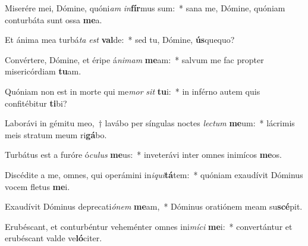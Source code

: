\item Miserére mei, Dómine, quóni\textit{am} \textit{in}\textbf{fír}mus sum:~* sana me, Dómine, quóniam conturbáta sunt ossa \textbf{me}a.
\item Et ánima mea turbá\textit{ta} \textit{est} \textbf{val}de:~* sed tu, Dómine, \textbf{ús}quequo?
\item Convértere, Dómine, et éripe á\textit{ni}\textit{mam} \textbf{me}am:~* salvum me fac propter misericórdiam \textbf{tu}am.
\item Quóniam non est in morte qui me\textit{mor} \textit{sit} \textbf{tu}i:~* in inférno autem quis confitébitur \textbf{ti}bi?
\item Laborávi in gémitu meo,~† lavábo per síngulas noctes \textit{lec}\textit{tum} \textbf{me}um:~* lácrimis meis stratum meum ri\textbf{gá}bo.
\item Turbátus est a furóre ó\textit{cu}\textit{lus} \textbf{me}us:~* inveterávi inter omnes inimícos \textbf{me}os.
\item Discédite a me, omnes, qui operámini in\textit{i}\textit{qui}\textbf{tá}tem:~* quóniam exaudívit Dóminus vocem fletus \textbf{me}i.
\item Exaudívit Dóminus deprecati\textit{ó}\textit{nem} \textbf{me}am,~* Dóminus oratiónem meam su\textbf{scé}pit.
\item Erubéscant, et conturbéntur veheménter omnes ini\textit{mí}\textit{ci} \textbf{me}i:~* convertántur et erubéscant valde ve\textbf{ló}citer.

